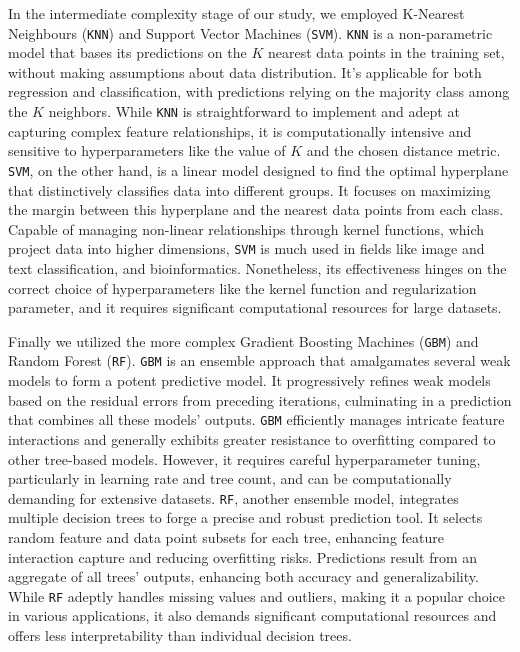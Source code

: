 \documentclass[12pt]{article}
\begin{document}
\par In the intermediate complexity stage of our study, we employed K-Nearest Neighbours (\texttt{KNN}) and Support Vector Machines (\texttt{SVM}). \texttt{KNN} is a non-parametric model that bases its predictions on the $K$ nearest data points in the training set, without making assumptions about data distribution. It's applicable for both regression and classification, with predictions relying on the majority class among the $K$ neighbors. While \texttt{KNN} is straightforward to implement and adept at capturing complex feature relationships, it is computationally intensive and sensitive to hyperparameters like the value of $K$ and the chosen distance metric. \texttt{SVM}, on the other hand, is a linear model designed to find the optimal hyperplane that distinctively classifies data into different groups. It focuses on maximizing the margin between this hyperplane and the nearest data points from each class. Capable of managing non-linear relationships through kernel functions, which project data into higher dimensions, \texttt{SVM} is much used in fields like image and text classification, and bioinformatics. Nonetheless, its effectiveness hinges on the correct choice of hyperparameters like the kernel function and regularization parameter, and it requires significant computational resources for large datasets.

\par Finally we utilized the more complex Gradient Boosting Machines (\texttt{GBM}) and Random Forest (\texttt{RF}). \texttt{GBM} is an ensemble approach that amalgamates several weak models to form a potent predictive model. It progressively refines weak models based on the residual errors from preceding iterations, culminating in a prediction that combines all these models' outputs. \texttt{GBM} efficiently manages intricate feature interactions and generally exhibits greater resistance to overfitting compared to other tree-based models. However, it requires careful hyperparameter tuning, particularly in learning rate and tree count, and can be computationally demanding for extensive datasets. \texttt{RF}, another ensemble model, integrates multiple decision trees to forge a precise and robust prediction tool. It selects random feature and data point subsets for each tree, enhancing feature interaction capture and reducing overfitting risks. Predictions result from an aggregate of all trees' outputs, enhancing both accuracy and generalizability. While \texttt{RF} adeptly handles missing values and outliers, making it a popular choice in various applications, it also demands significant computational resources and offers less interpretability than individual decision trees.
\end{document}
